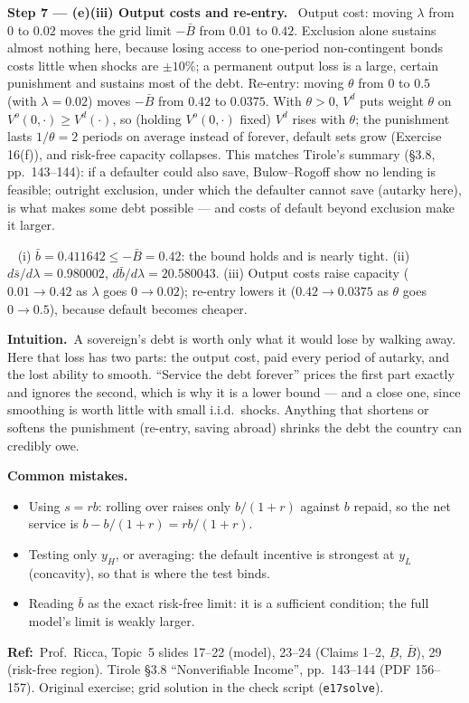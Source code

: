 \documentclass[11pt,a4paper]{article}
\newcommand{\step}[2]{\par\medskip\noindent\textbf{Step #1 --- #2.}~}
\newcommand{\intuition}{\par\medskip\noindent\textbf{Intuition.}~}
\newcommand{\refbib}{\par\smallskip\noindent\textbf{Ref:}~}
\newcommand{\answer}[1]{\par\smallskip\noindent\fbox{\textbf{Answer #1.}}~}
\newcommand{\pitfalls}{\par\medskip\noindent\textbf{Common mistakes.}}
\begin{document}
\step{7}{(e)(iii) Output costs and re-entry} Output cost: moving $\lambda$ from $0$ to $0.02$ moves the grid limit $-\bar B$ from $0.01$ to $0.42$. Exclusion alone
sustains almost nothing here, because losing access to one-period non-contingent bonds costs little when shocks are $\pm10\%$; a permanent output loss is a large,
certain punishment and sustains most of the debt. Re-entry: moving $\theta$ from $0$ to $0.5$ (with $\lambda=0.02$) moves $-\bar B$ from $0.42$ to $0.0375$. With
$\theta>0$, $V^d$ puts weight $\theta$ on $V^o(0,\cdot)\ge V^d(\cdot)$, so (holding $V^o(0,\cdot)$ fixed) $V^d$ rises with $\theta$; the punishment lasts $1/\theta=2$ periods on
average instead of forever, default sets grow (Exercise 16(f)), and risk-free capacity collapses. This matches Tirole's summary (\S3.8, pp.~143--144): if a defaulter
could also save, Bulow--Rogoff show no lending is feasible; outright exclusion, under which the defaulter cannot save (autarky here), is what makes some debt
possible --- and costs of default beyond exclusion make it larger.

\answer{(e)} (i) $\bar b=0.411642\le-\bar B=0.42$: the bound holds and is nearly tight. (ii) $d\bar s/d\lambda=0.980002$, $d\bar b/d\lambda=20.580043$. (iii) Output costs
raise capacity ($0.01\to0.42$ as $\lambda$ goes $0\to0.02$); re-entry lowers it ($0.42\to0.0375$ as $\theta$ goes $0\to0.5$), because default becomes cheaper.

\intuition A sovereign's debt is worth only what it would lose by walking away. Here that loss has two parts: the output cost, paid every period of autarky, and the
lost ability to smooth. ``Service the debt forever'' prices the first part exactly and ignores the second, which is why it is a lower bound --- and a close one, since
smoothing is worth little with small i.i.d.\ shocks. Anything that shortens or softens the punishment (re-entry, saving abroad) shrinks the debt the country can credibly owe.

\pitfalls
\begin{itemize}
  \item Using $s=rb$: rolling over raises only $b/(1+r)$ against $b$ repaid, so the net service is $b-b/(1+r)=rb/(1+r)$.
  \item Testing only $y_H$, or averaging: the default incentive is strongest at $y_L$ (concavity), so that is where the test binds.
  \item Reading $\bar b$ as the exact risk-free limit: it is a sufficient condition; the full model's limit is weakly larger.
\end{itemize}

\refbib Prof.\ Ricca, Topic~5 slides 17--22 (model), 23--24 (Claims 1--2, $\underline B$, $\bar B$), 29 (risk-free region). Tirole \S3.8 ``Nonverifiable Income'', pp.~143--144 (PDF 156--157). Original exercise; grid solution in the check script (\texttt{e17solve}).
\end{document}
